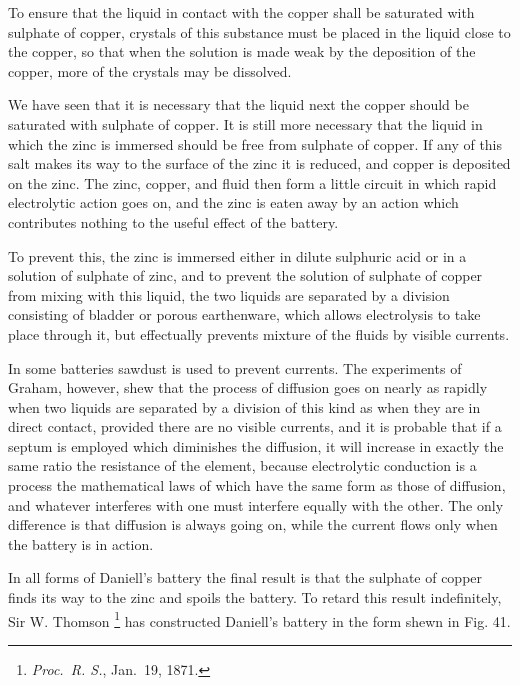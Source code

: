 \documentclass[12pt,oneside]{book}[2021/10/04]
\let\oldfootnote\footnote
\renewcommand\footnote[1]{%
\oldfootnote{\hspace{0.14em}#1}}
\newcommand{\Runhead}[1]{\fancyhead[C]{\iffloatpage{}{\small#1}}}
\newcommand{\¬}{\hphantom{0}}
\begin{document}
To ensure that the liquid in contact with the copper shall be
saturated with sulphate of copper, crystals of this substance must
be placed in the liquid close to the copper, so that when the solution
is made weak by the deposition of the copper, more of the crystals
may be dissolved.

We have seen that it is necessary that the liquid next the copper
should be saturated with sulphate of copper. It is still more
necessary that the liquid in which the zinc is immersed should be
free from sulphate of copper. If any of this salt makes its way
to the surface of the zinc it is reduced, and copper is deposited
on the zinc. The zinc, copper, and fluid then form a little circuit
in which rapid electrolytic action goes on, and the zinc is eaten
away by an action which contributes nothing to the useful effect
of the battery.

To prevent this, the zinc is immersed either in dilute sulphuric
acid or in a solution of sulphate of zinc, and to prevent the solution
of sulphate of copper from mixing with this liquid, the two liquids
are separated by a division consisting of bladder or porous earthenware,
which allows electrolysis to take place through it, but
effectually prevents mixture of the fluids by visible currents.

In some batteries sawdust is used to prevent currents. The
experiments of Graham, however, shew that the process of diffusion
goes on nearly as rapidly when two liquids are separated by a
division of this kind as when they are in direct contact, provided
there are no visible currents, and it is probable that if a septum
is employed which diminishes the diffusion, it will increase in
exactly the same ratio the resistance of the element, because electrolytic
conduction is a process the mathematical laws of which
have the same form as those of diffusion, and whatever interferes
with one must interfere equally with the other. The only difference
is that diffusion is always going on, while the current flows
only when the battery is in action.

In all forms of Daniell's battery the final result is that the
sulphate of copper finds its way to the zinc and spoils the battery.
To retard this result indefinitely, Sir W. Thomson\footnote{
\textit{Proc.\ R. S.}, Jan.\ 19, 1871.} has constructed
Daniell's battery in the form shewn in Fig. 41.
\Runhead{DANIELL'S BATTERY.}
\end{document}
